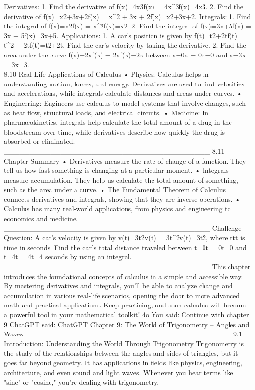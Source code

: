 Derivatives:
1.	Find the derivative of f(x)=4x3f(x) = 4x^3f(x)=4x3.
2.	Find the derivative of f(x)=x2+3x+2f(x) = x^2 + 3x + 2f(x)=x2+3x+2.
Integrals:
1.	Find the integral of f(x)=x2f(x) = x^2f(x)=x2.
2.	Find the integral of f(x)=3x+5f(x) = 3x + 5f(x)=3x+5.
Applications:
1.	A car’s position is given by f(t)=t2+2tf(t) = t^2 + 2tf(t)=t2+2t. Find the car’s velocity by taking the derivative.
2.	Find the area under the curve f(x)=2xf(x) = 2xf(x)=2x between x=0x = 0x=0 and x=3x = 3x=3.
________________________________________
8.10 Real-Life Applications of Calculus
•	Physics: Calculus helps in understanding motion, forces, and energy. Derivatives are used to find velocities and accelerations, while integrals calculate distances and areas under curves.
•	Engineering: Engineers use calculus to model systems that involve changes, such as heat flow, structural loads, and electrical circuits.
•	Medicine: In pharmacokinetics, integrals help calculate the total amount of a drug in the bloodstream over time, while derivatives describe how quickly the drug is absorbed or eliminated.
________________________________________
8.11 Chapter Summary
•	Derivatives measure the rate of change of a function. They tell us how fast something is changing at a particular moment.
•	Integrals measure accumulation. They help us calculate the total amount of something, such as the area under a curve.
•	The Fundamental Theorem of Calculus connects derivatives and integrals, showing that they are inverse operations.
•	Calculus has many real-world applications, from physics and engineering to economics and medicine.
________________________________________
Challenge Question:
A car’s velocity is given by v(t)=3t2v(t) = 3t^2v(t)=3t2, where ttt is time in seconds. Find the car’s total distance traveled between t=0t = 0t=0 and t=4t = 4t=4 seconds by using an integral.
________________________________________
This chapter introduces the foundational concepts of calculus in a simple and accessible way. By mastering derivatives and integrals, you’ll be able to analyze change and accumulation in various real-life scenarios, opening the door to more advanced math and practical applications. Keep practicing, and soon calculus will become a powerful tool in your mathematical toolkit!
4o
You said:
Continue with chapter 9
ChatGPT said:
ChatGPT
Chapter 9: The World of Trigonometry – Angles and Waves
________________________________________
9.1 Introduction: Understanding the World Through Trigonometry
Trigonometry is the study of the relationships between the angles and sides of triangles, but it goes far beyond geometry. It has applications in fields like physics, engineering, architecture, and even sound and light waves. Whenever you hear terms like "sine" or "cosine," you're dealing with trigonometry.
